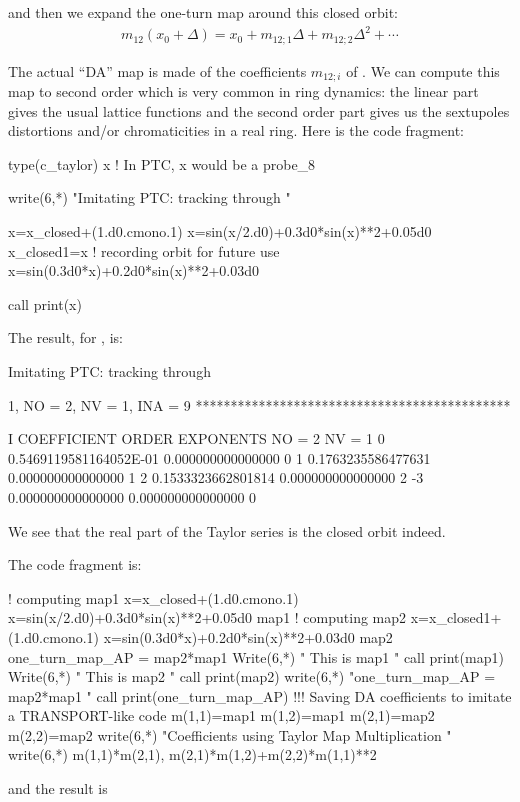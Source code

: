 \documentclass{hitec}     %
\begin{document}
{and then we expand the one-turn map around this closed orbit:
%
%
\begin{align} {m}_{12}({x}_{0}+\Delta )=
{x}_{0}+{m}_{12;1}\Delta +{m}_{12;2}{\Delta }^{2}+\cdots\label{eq:m1t0}\end{align}

The actual ``DA'' map is made of the coefficients $m_{12;i}$ of . We can compute this map to second order which is very common in ring dynamics: the linear part gives the usual lattice functions and the second order  part gives us the sextupoles distortions and/or chromaticities in a real ring. Here is the code fragment:

\begin{code}
type(c_taylor)  x   ! In PTC, x would be a probe_8

write(6,*) "Imitating PTC: tracking through  "

x=x_closed+(1.d0.cmono.1)
x=sin(x/2.d0)+0.3d0*sin(x)**2+0.05d0     
x_closed1=x	! recording orbit for future use
x=sin(0.3d0*x)+0.2d0*sin(x)**2+0.03d0

call print(x)
 \end{code}
 
 The result, for , is:
\begin{code}
 Imitating PTC: tracking through

          1, NO =    2, NV =    1, INA =    9
 *********************************************

    I  COEFFICIENT          ORDER   EXPONENTS
      NO =     2      NV =     1
   0  0.5469119581164052E-01   0.000000000000000       0
   1  0.1763235586477631       0.000000000000000       1
   2  0.1533323662801814       0.000000000000000       2
    -3   0.000000000000000       0.000000000000000       0
\end{code}
We see that the real part of the Taylor series is the closed orbit indeed.



The code fragment is:



\begin{code}
! computing map1
x=x_closed+(1.d0.cmono.1)
x=sin(x/2.d0)+0.3d0*sin(x)**2+0.05d0  
map1%
! computing map2
x=x_closed1+(1.d0.cmono.1)
x=sin(0.3d0*x)+0.2d0*sin(x)**2+0.03d0
map2%
one_turn_map_AP = map2*map1
Write(6,*) " This is map1 "
call print(map1)
Write(6,*) " This is map2 "
call print(map2)
write(6,*) "one_turn_map_AP = map2*map1 "
call print(one_turn_map_AP)
!!! Saving DA coefficients to imitate a TRANSPORT-like code
m(1,1)=map1%
m(1,2)=map1%
m(2,1)=map2%
m(2,2)=map2%
write(6,*) "Coefficients using Taylor Map Multiplication "
write(6,*) m(1,1)*m(2,1), m(2,1)*m(1,2)+m(2,2)*m(1,1)**2
\end{code} 
and the result is


}
\end{document}
